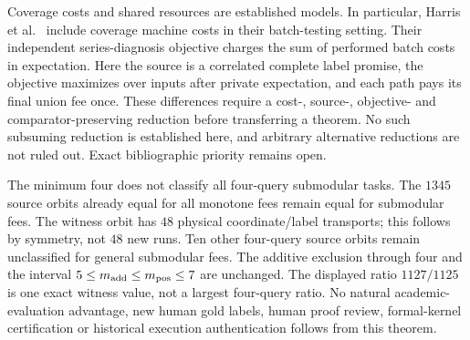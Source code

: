 Coverage costs and shared resources are established models. In particular,
Harris et al.~\cite{harris2025} include coverage machine costs in their
batch-testing setting. Their independent series-diagnosis objective
charges the sum of performed batch costs in expectation. Here the
source is a correlated complete label promise, the objective maximizes
over inputs after private expectation, and each path pays its final
union fee once. These differences require a cost-, source-, objective-
and comparator-preserving reduction before transferring a theorem.
No such subsuming reduction is established here, and arbitrary alternative
reductions are not ruled out. Exact bibliographic priority remains open.

The minimum four does not classify all four-query submodular tasks.
The $1345$ source orbits already equal for all monotone fees remain equal
for submodular fees. The witness orbit has $48$ physical coordinate/label
transports; this follows by symmetry, not $48$ new runs. Ten other
four-query source orbits remain unclassified for general submodular fees.
The additive exclusion through four and the interval
$5\leq m_{\rm add}\leq m_{\rm pos}\leq7$ are unchanged. The displayed
ratio $1127/1125$ is one exact witness value, not a largest four-query
ratio. No natural academic-evaluation advantage, new human gold labels,
human proof review, formal-kernel certification or historical execution
authentication follows from this theorem.

